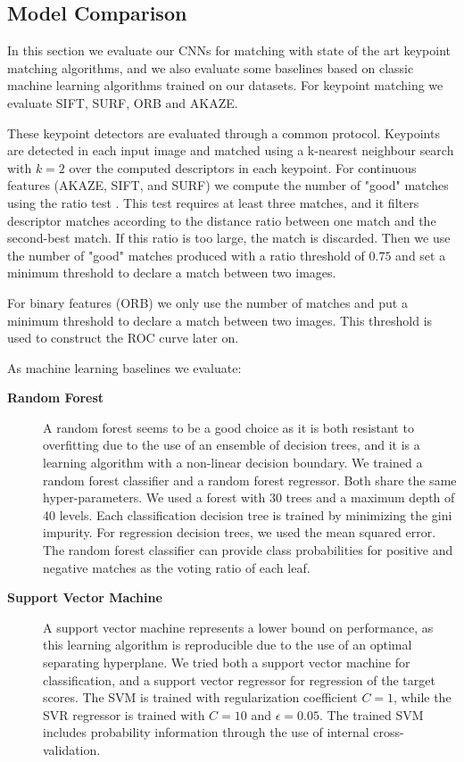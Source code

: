 \subsection{Model Comparison}

In this section we evaluate our CNNs for matching with state of the art keypoint matching algorithms, and we also evaluate some baselines based on classic machine learning algorithms trained on our datasets. For keypoint matching we evaluate SIFT, SURF, ORB and AKAZE.

These keypoint detectors are evaluated through a common protocol. Keypoints are detected in each input image and matched using a k-nearest neighbour search with $k = 2$ over the computed descriptors in each keypoint. For continuous features (AKAZE, SIFT, and SURF) we compute the number of "good" matches using the ratio test \cite{lowe2004distinctive}. This test requires at least three matches, and it filters descriptor matches according to the distance ratio between one match and the second-best match. If this ratio is too large, the match is discarded. Then we use the number of "good" matches produced with a ratio threshold of $0.75$ and set a minimum threshold to declare a match between two images.

For binary features (ORB) we only use the number of matches and put a minimum threshold to declare a match between two images. This threshold is used to construct the ROC curve later on.

As machine learning baselines we evaluate:

\begin{description}
	\item[\textbf{Random Forest}] A random forest \cite{murphy2012machine} seems to be a good choice as it is both resistant to overfitting due to the use of an ensemble of decision trees, and it is a learning algorithm with a non-linear decision boundary. We trained a random forest classifier and a random forest regressor. Both share the same hyper-parameters. We used a forest with 30 trees and a maximum depth of 40 levels. Each classification decision tree is trained by minimizing the gini impurity. For regression decision trees, we used the mean squared error. The random forest classifier can provide class probabilities for positive and negative matches as the voting ratio of each leaf.
	
	\item[\textbf{Support Vector Machine}] A support vector machine represents a lower bound on performance, as this learning algorithm is reproducible due to the use of an optimal separating hyperplane. We tried both a support vector machine for classification, and a support vector regressor for regression of the target scores. The SVM is trained with regularization coefficient $C = 1$, while the SVR regressor is trained with $C = 10$ and $\epsilon = 0.05$. The trained SVM includes probability information through the use of internal cross-validation.
\end{description}

